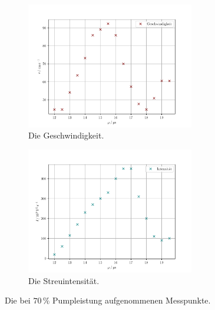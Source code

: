 \begin{figure}
    \centering
    \begin{subfigure}{0.48\textwidth}
        \centering
        \includegraphics[height=5.5cm]{plots/70velocity.pdf}
        \caption{Die Geschwindigkeit.}
        \label{fig:70velo}
    \end{subfigure}
    \begin{subfigure}{0.48\textwidth}
        \centering
        \includegraphics[height=5.5cm]{plots/70intensity.pdf}
        \caption{Die Streuintensität.}
        \label{fig:70inten}
    \end{subfigure}
    \caption{Die bei $70\,\%$ Pumpleistung aufgenommenen Messpunkte.}
    \label{fig:70vi}
\end{figure}

